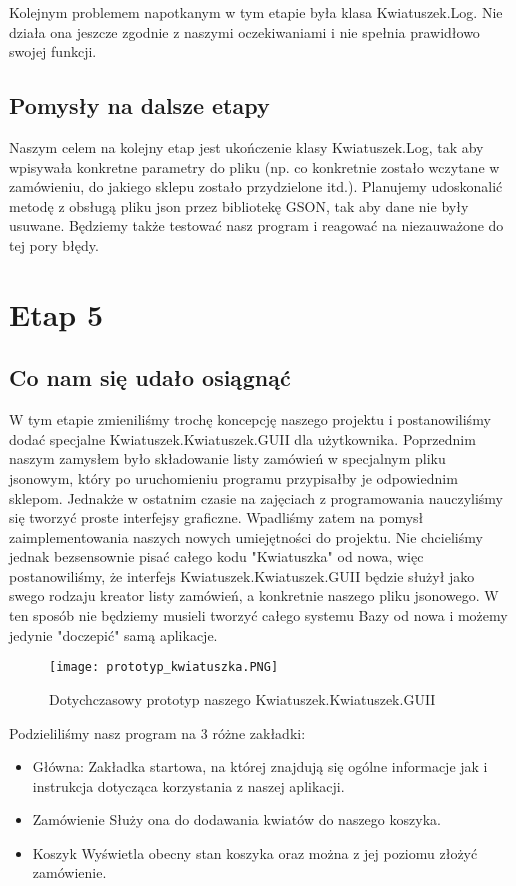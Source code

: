\documentclass{article}
\begin{document}
        
        Kolejnym problemem napotkanym w tym etapie była klasa Kwiatuszek.Log. Nie działa ona jeszcze zgodnie z naszymi oczekiwaniami i nie spełnia prawidłowo swojej funkcji.
        \subsection{Pomysły na dalsze etapy}
        Naszym celem na kolejny etap jest ukończenie klasy Kwiatuszek.Log, tak aby wpisywała konkretne parametry do pliku (np. co konkretnie zostało wczytane w zamówieniu, do jakiego sklepu zostało przydzielone itd.). Planujemy udoskonalić metodę z obsługą pliku json przez bibliotekę GSON, tak aby dane nie były usuwane. Będziemy także testować nasz program i reagować na niezauważone do tej pory błędy.
    
    \clearpage
    
    \section{Etap 5}
        \subsection{Co nam się udało osiągnąć}
        W tym etapie zmieniliśmy trochę koncepcję naszego projektu i postanowiliśmy dodać specjalne Kwiatuszek.Kwiatuszek.GUII dla użytkownika. Poprzednim naszym zamysłem było składowanie listy zamówień w specjalnym pliku jsonowym, który po uruchomieniu programu przypisałby je odpowiednim sklepom. Jednakże w ostatnim czasie na zajęciach z programowania nauczyliśmy się tworzyć proste interfejsy graficzne. Wpadliśmy zatem na pomysł zaimplementowania naszych nowych umiejętności do projektu. Nie chcieliśmy jednak bezsensownie pisać całego kodu "Kwiatuszka" od nowa, więc postanowiliśmy, że interfejs Kwiatuszek.Kwiatuszek.GUII będzie służył jako swego rodzaju kreator listy zamówień, a konkretnie naszego pliku jsonowego. W ten sposób nie będziemy musieli tworzyć całego systemu Bazy od nowa i możemy jedynie "doczepić" samą aplikacje.
        
        
        \begin{figure}[hbt]
                \centering
                \texttt{[image: prototyp\_kwiatuszka.PNG]}
                \caption{Dotychczasowy prototyp naszego Kwiatuszek.Kwiatuszek.GUII}
        \end{figure}
        
        Podzieliliśmy nasz program na 3 różne zakładki:
        \begin{itemize}
            \item Główna: \newline
            Zakładka startowa, na której znajdują się ogólne informacje jak i instrukcja dotycząca korzystania z naszej aplikacji.
            \item Zamówienie \newline
            Służy ona do dodawania kwiatów do naszego koszyka.
            \item Koszyk\newline
            Wyświetla obecny stan koszyka oraz można z jej poziomu złożyć zamówienie. 
        \end{itemize}
\end{document}
